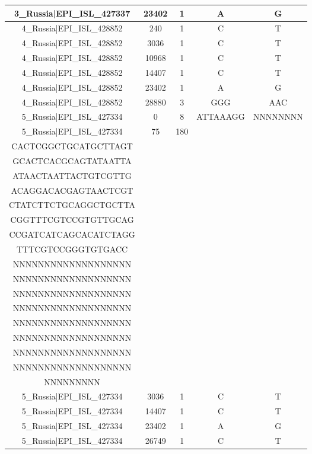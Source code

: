 \documentclass[a4paper,10pt]{article}
\begin{document}
\begin{longtable}{@{}ccccc@{}}
3\_Russia|EPI\_ISL\_427337 & 23402 & 1 & A & G \\* \midrule
4\_Russia|EPI\_ISL\_428852 & 240 & 1 & C & T \\* \midrule
4\_Russia|EPI\_ISL\_428852 & 3036 & 1 & C & T \\* \midrule
4\_Russia|EPI\_ISL\_428852 & 10968 & 1 & C & T \\* \midrule
4\_Russia|EPI\_ISL\_428852 & 14407 & 1 & C & T \\* \midrule
4\_Russia|EPI\_ISL\_428852 & 23402 & 1 & A & G \\* \midrule
4\_Russia|EPI\_ISL\_428852 & 28880 & 3 & GGG & AAC \\* \midrule
5\_Russia|EPI\_ISL\_427334 & 0 & 8 & ATTAAAGG & NNNNNNNN \\* \midrule
5\_Russia|EPI\_ISL\_427334 & 75 & 180 & \begin{tabular}[c]{@{}c@{}}TTTAAAATCTGTGTGGCTGT\\ CACTCGGCTGCATGCTTAGT\\ GCACTCACGCAGTATAATTA\\ ATAACTAATTACTGTCGTTG\\ ACAGGACACGAGTAACTCGT\\ CTATCTTCTGCAGGCTGCTTA\\ CGGTTTCGTCCGTGTTGCAG\\ CCGATCATCAGCACATCTAGG\\ TTTCGTCCGGGTGTGACC\end{tabular} & \begin{tabular}[c]{@{}c@{}}NNNNNNNNNNNNNNNNNNN\\ NNNNNNNNNNNNNNNNNNN\\ NNNNNNNNNNNNNNNNNNN\\ NNNNNNNNNNNNNNNNNNN\\ NNNNNNNNNNNNNNNNNNN\\ NNNNNNNNNNNNNNNNNNN\\ NNNNNNNNNNNNNNNNNNN\\ NNNNNNNNNNNNNNNNNNN\\ NNNNNNNNNNNNNNNNNNN\\ NNNNNNNNN\end{tabular} \\* \midrule
5\_Russia|EPI\_ISL\_427334 & 3036 & 1 & C & T \\* \midrule
5\_Russia|EPI\_ISL\_427334 & 14407 & 1 & C & T \\* \midrule
5\_Russia|EPI\_ISL\_427334 & 23402 & 1 & A & G \\* \midrule
5\_Russia|EPI\_ISL\_427334 & 26749 & 1 & C & T \\* \midrule

\end{longtable}
\end{document}
